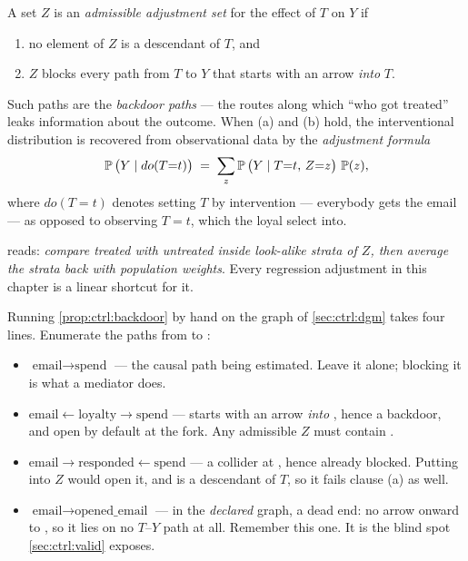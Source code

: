\begin{proposition}
\label{prop:ctrl:backdoor}
A set $Z$ is an \emph{admissible adjustment set} for the effect of $T$ on $Y$ if
%
\begin{enumerate}[label=(\alph*), leftmargin=2.2em, itemsep=.15em]
  \item no element of $Z$ is a descendant of $T$, and
  \item $Z$ blocks every path from $T$ to $Y$ that starts with an arrow \emph{into} $T$.
\end{enumerate}
%
Such paths are the \emph{backdoor paths} --- the routes along which ``who got treated'' leaks
information about the outcome. When (a) and (b) hold, the interventional distribution is
recovered from observational data by the \emph{adjustment formula}
%
\begin{equation}
  \operatorname{\mathbb{P}}\big(Y \mid do(T{=}t)\big) \;=\; \sum_{z} \operatorname{\mathbb{P}}\big(Y \mid T{=}t,\, Z{=}z\big)\,\operatorname{\mathbb{P}}(z),
  \label{eq:ctrl:adjust}
\end{equation}
%
where $do(T{=}t)$ denotes setting $T$ by intervention --- everybody gets the email --- as opposed
to observing $T{=}t$, which the loyal select into.
\end{proposition}

 reads: \emph{compare treated with untreated inside look-alike strata of
$Z$, then average the strata back with population weights}. Every regression adjustment in this
chapter is a linear shortcut for it.

Running \cref{prop:ctrl:backdoor} by hand on the graph of \cref{sec:ctrl:dgm} takes four lines.
Enumerate the paths from  to :

\begin{itemize}[leftmargin=*, itemsep=.15em]
  \item $\text{email} \to \text{spend}$ --- the causal path being estimated. Leave it alone;
        blocking it is what a mediator does.
  \item $\text{email} \leftarrow \text{loyalty} \to \text{spend}$ --- starts with an arrow
        \emph{into} , hence a backdoor, and open by default at the fork. Any
        admissible $Z$ must contain .
  \item $\text{email} \to \text{responded} \leftarrow \text{spend}$ --- a collider at
        , hence already blocked. Putting  into $Z$ would open it,
        and  is a descendant of $T$, so it fails clause (a) as well.
  \item $\text{email} \to \text{opened\_email}$ --- in the \emph{declared} graph, a dead end: no
        arrow onward to , so it lies on no $T$--$Y$ path at all. Remember this one.
        It is the blind spot \cref{sec:ctrl:valid} exposes.
\end{itemize}

